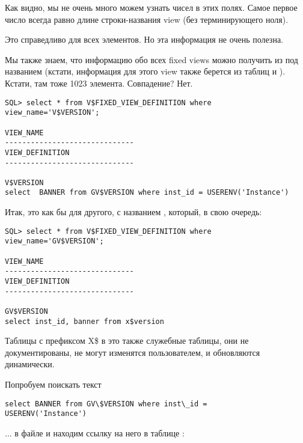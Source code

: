 Как видно, мы не очень много можем узнать чисел в этих полях. Самое первое число всегда равно длине строки-названия view (без терминирующего ноля).

Это справедливо для всех элементов. Но эта информация не очень полезна.

Мы также знаем, что информацию обо всех fixed views можно получить из  под названием
(кстати, информация для этого view также берется из таблиц  и ).
Кстати, там тоже 1023 элемента. Совпадение? Нет.

\begin{lstlisting}
SQL> select * from V$FIXED_VIEW_DEFINITION where view_name='V$VERSION';

VIEW_NAME
------------------------------
VIEW_DEFINITION
------------------------------

V$VERSION
select  BANNER from GV$VERSION where inst_id = USERENV('Instance')
\end{lstlisting}

Итак,  это как бы  для другого, с названием , который, в свою очередь:

\begin{lstlisting}
SQL> select * from V$FIXED_VIEW_DEFINITION where view_name='GV$VERSION';

VIEW_NAME
------------------------------
VIEW_DEFINITION
------------------------------

GV$VERSION
select inst_id, banner from x$version
\end{lstlisting}

Таблицы с префиксом X\$ в \oracle\EMDASH{}это также служебные таблицы, они не документированы,
не могут изменятся пользователем, и обновляются динамически.

Попробуем поискать текст \\
\begin{lstlisting}
select BANNER from GV\$VERSION where inst\_id = 
USERENV('Instance')
\end{lstlisting}
... в файле  и находим ссылку на него в таблице :

